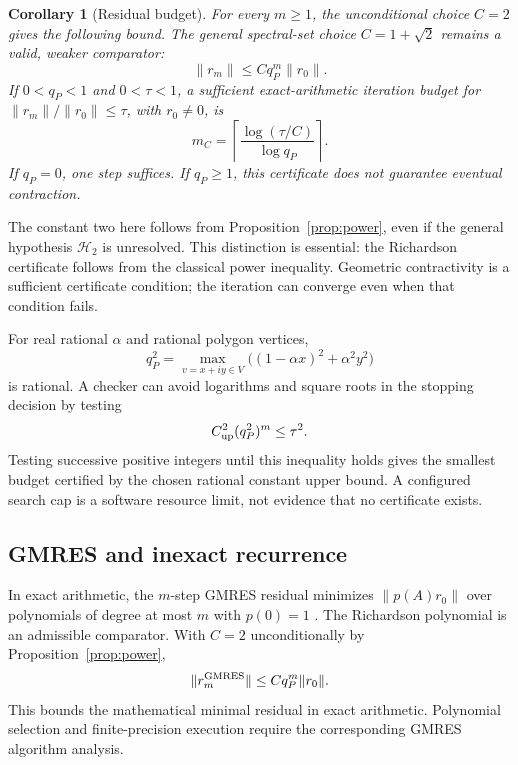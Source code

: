 \documentclass[11pt]{article}
\newcommand{\norm}[1]{\lVert #1\rVert}
\newcommand{\cbase}{1+\sqrt{2}}
\newcommand{\HH}{\mathcal H}
\newtheorem{corollary}[theorem]{Corollary}
\theoremstyle{definition}
\theoremstyle{remark}
\numberwithin{equation}{section}
\begin{document}
\begin{corollary}[Residual budget]\label{cor:richardson}
For every \(m\ge1\), the unconditional choice \(C=2\) gives the
following bound. The general spectral-set choice \(C=\cbase\) remains
a valid, weaker comparator:
\[
 \norm{r_m}\le Cq_P^m\norm{r_0}.
\]
If \(0<q_P<1\) and \(0<\tau<1\), a sufficient exact-arithmetic
iteration budget for
\(\norm{r_m}/\norm{r_0}\le\tau\), with \(r_0\ne0\), is
\begin{equation}\label{eq:iterations}
 m_C=\left\lceil
 \frac{\log(\tau/C)}{\log q_P}
 \right\rceil.
\end{equation}
If \(q_P=0\), one step suffices.
If \(q_P\ge1\), this certificate does not guarantee eventual contraction.
\end{corollary}
The constant two here follows from Proposition~\ref{prop:power}, even if
the general hypothesis \(\HH_2\) is unresolved. This distinction is
essential: the Richardson certificate follows from the classical power
inequality. Geometric contractivity is a sufficient certificate condition;
the iteration can converge even when that condition fails.

For real rational \(\alpha\) and rational polygon vertices,
\[
 q_P^2=\max_{v=x+iy\in V}
 \bigl((1-\alpha x)^2+\alpha^2y^2\bigr)
\]
is rational.
A checker can avoid logarithms and square roots in the stopping decision by
testing
\begin{equation}\label{eq:rationalstop}
 C_{\rm up}^2(q_P^2)^m\le\tau^2.
\end{equation}
Testing successive positive integers until this inequality holds gives the
smallest budget certified by the chosen rational constant upper bound.
A configured search cap is a software resource limit, not evidence that
no certificate exists.

\subsection{GMRES and inexact recurrence}
In exact arithmetic, the \(m\)-step GMRES residual minimizes
\(\norm{p(A)r_0}\) over polynomials of degree at most \(m\) with \(p(0)=1\)
\citep{SaadSchultz1986}.
The Richardson polynomial is an admissible comparator. With \(C=2\)
unconditionally by Proposition~\ref{prop:power},
\[
 \norm{r_m^{\rm GMRES}}\le Cq_P^m\norm{r_0}.
\]
This bounds the mathematical minimal residual in exact arithmetic.
Polynomial selection and finite-precision execution require the
corresponding GMRES algorithm analysis.
\end{document}
